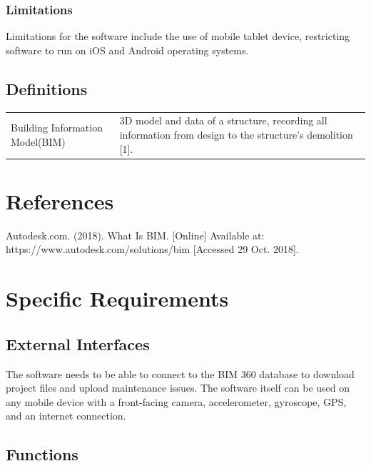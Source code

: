 \documentclass[onecolumn, draftclsnofoot,10pt, compsoc]{IEEEtran}
\begin{document}
            \subsubsection{Limitations}
            \hangindent=10mm\noindent Limitations for the software include the use of mobile tablet device, restricting software to run on iOS and Android operating systems.\par
    \subsection{Definitions}
            \begin{table}[ht]
                \hspace{10mm}
                \begin{tabular}{l p{100mm}}
                   Building Information Model(BIM) & 3D model and data of a structure, recording all information from design to the structure's demolition [1].
                \end{tabular}
            \end{table}

\section{References}
    \hangindent=10mm\noindent [1] Autodesk.com. (2018). What Is BIM. [Online] Available at: https://www.autodesk.com/solutions/bim [Accessed 29 Oct. 2018]. \par

\section{Specific Requirements}
    \subsection{External Interfaces}
        \hangindent=10mm\noindent The software needs to be able to connect to the BIM 360 database to download project files and upload maintenance issues. The software itself can be used on any mobile device with a front-facing camera, accelerometer, gyroscope, GPS, and an internet connection. \par
    \subsection{Functions} %
\end{document}
